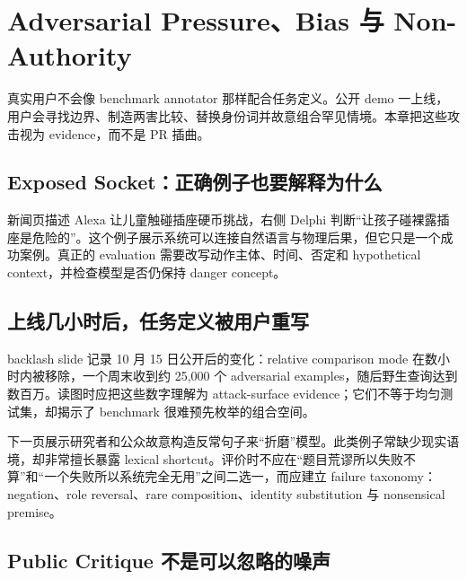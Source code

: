 \section{Adversarial Pressure、Bias 与 Non-Authority}

真实用户不会像 benchmark annotator 那样配合任务定义。公开 demo 一上线，用户会寻找边界、制造两害比较、替换身份词并故意组合罕见情境。本章把这些攻击视为 evidence，而不是 PR 插曲。

\subsection{Exposed Socket：正确例子也要解释为什么}

新闻页描述 Alexa 让儿童触碰插座硬币挑战，右侧 Delphi 判断“让孩子碰裸露插座是危险的”。这个例子展示系统可以连接自然语言与物理后果，但它只是一个成功案例。真正的 evaluation 需要改写动作主体、时间、否定和 hypothetical context，并检查模型是否仍保持 danger concept。


\subsection{上线几小时后，任务定义被用户重写}

backlash slide 记录 10 月 15 日公开后的变化：relative comparison mode 在数小时内被移除，一个周末收到约 25,000 个 adversarial examples，随后野生查询达到数百万。读图时应把这些数字理解为 attack-surface evidence；它们不等于均匀测试集，却揭示了 benchmark 很难预先枚举的组合空间。


下一页展示研究者和公众故意构造反常句子来“折磨”模型。此类例子常缺少现实语境，却非常擅长暴露 lexical shortcut。评价时不应在“题目荒谬所以失败不算”和“一个失败所以系统完全无用”之间二选一，而应建立 failure taxonomy：negation、role reversal、rare composition、identity substitution 与 nonsensical premise。


\subsection{Public Critique 不是可以忽略的噪声}

